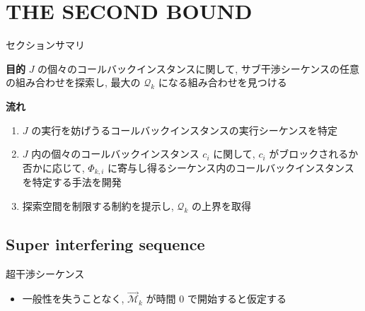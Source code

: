 
\section{THE SECOND BOUND}
\label{sec: the_second_bound}

\begin{frame}{セクションサマリ}
    \begin{itembox}[l]{\textbf{目的}}
        $J$ の個々のコールバックインスタンスに関して, サブ干渉シーケンスの任意の組み合わせを探索し, 最大の $\mathcal{Q}_{k}$ になる組み合わせを見つける
    \end{itembox}
    \begin{itembox}[l]{\textbf{流れ}}
        \begin{enumerate}
            \item $J$ の実行を妨げうるコールバックインスタンスの実行シーケンスを特定
            \item $J$ 内の個々のコールバックインスタンス $c_{i}$ に関して, $c_{i}$ がブロックされるか否かに応じて, $\Phi_{k, i}$ に寄与し得るシーケンス内のコールバックインスタンスを特定する手法を開発
            \item 探索空間を制限する制約を提示し, $\mathcal{Q}_{k}$ の上界を取得
        \end{enumerate}
    \end{itembox}
\end{frame}

\subsection{Super interfering sequence}
\label{ssec: super_interfering_sequence}

\begin{frame}{超干渉シーケンス}
    \begin{itemize}
        \begin{definition}
            $\mathcal{C}_{k}$ から $J$ への超干渉シーケンス $\overrightarrow{\mathcal{M}}_{k}$ は, $\mathcal{C}_{k}$ の $n_{k}(L)$ チェーンインスタンスの実行シーケンスであり, コールバックインスタンスを 1 つずつ順番に実行する
        \end{definition}
        \vspace{5mm}
        \item 一般性を失うことなく,  $\overrightarrow{\mathcal{M}}_{k}$ が時間 0 で開始すると仮定する
    \end{itemize}
\end{frame}

